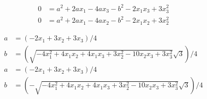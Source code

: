 \begin{align}
  0 & = a^{2}+2 a x_1 - 4 a x_3 - b^{2} - 2 x_1 x_3+3 x_3^{2}  \\
   0 & = a^{2}+2 a x_1 - 4 a x_2 - b^{ 2} - 2 x_1 x_2+3 x_2^{2}  
\end{align}

 
\begin{align}
   a & =  \left(  - 2 x_1+3 x_2+3 x_3 \right)  / 4  \\
   b & =  \left( \sqrt { - 4 x_1^{2}+4 x_1 x_2+4 x_1  x_3+3 x_2^{2} - 10 x_2 x_3+3 x_3^{2}} \sqrt {3} \right)  / 4   \\
    a & =  \left(  - 2 x_1+3 x_2+ 3 x_3 \right)  / 4  \\
   b & =  \left(  - \sqrt { - 4 x_1^{2}+4 x_1 x_2+4 x_1 x_3+3 x_2^{2} - 10 x_2  x_3+3 x_3^{2}} \sqrt {3} \right)  / 4   
\end{align}
